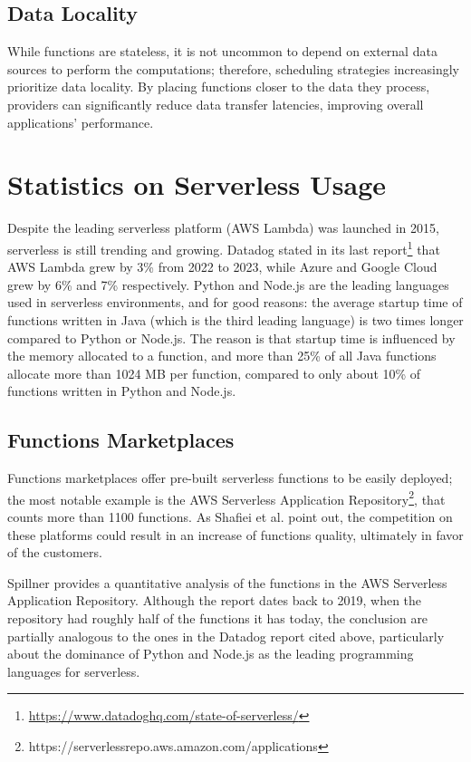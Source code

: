 \documentclass[
	a4paper, %
	12pt,
	twoside, %
]{LTJournalArticle}
\begin{document}
\subsection{Data Locality}
While functions are stateless, it is not uncommon to depend on external data sources to perform the computations; therefore, scheduling strategies increasingly prioritize data locality. By placing functions closer to the data they process, providers can significantly reduce data transfer latencies, improving overall applications' performance.

\section{Statistics on Serverless Usage}
Despite the leading serverless platform (AWS Lambda) was launched in 2015, serverless is still trending and growing. Datadog stated in its last report\footnote{\href{https://www.datadoghq.com/state-of-serverless/}{https://www.datadoghq.com/state-of-serverless/}} that AWS Lambda grew by 3\% from 2022 to 2023, while Azure and Google Cloud grew by 6\% and 7\% respectively. Python and Node.js are the leading languages used in serverless environments, and for good reasons: the average startup time of functions written in Java (which is the third leading language) is two times longer compared to Python or Node.js. The reason is that startup time is influenced by the memory allocated to a function, and more than 25\% of all Java functions allocate more than 1024 MB per function, compared to only about 10\% of functions written in Python and Node.js.

\subsection{Functions Marketplaces}
Functions marketplaces offer pre-built serverless functions to be easily deployed; the most notable example is the AWS Serverless Application Repository\footnote{https://serverlessrepo.aws.amazon.com/applications}, that counts more than 1100 functions. As Shafiei et al. \cite{shafiei_serverless_2022} point out, the competition on these platforms could result in an increase of functions quality, ultimately in favor of the customers. 

Spillner \cite{spillner_quantitative_2019} provides a quantitative analysis of the functions in the AWS Serverless Application Repository. Although the report dates back to 2019, when the repository had roughly half of the functions it has today, the conclusion are partially analogous to the ones in the Datadog report cited above, particularly about the dominance of Python and Node.js as the leading programming languages for serverless.
\end{document}
